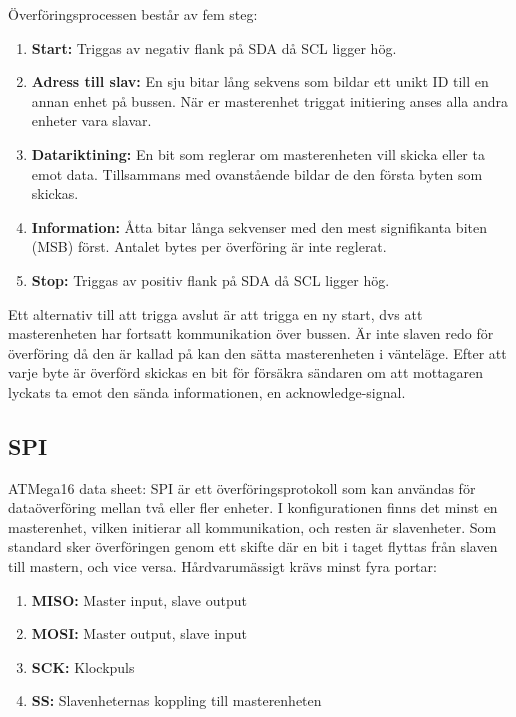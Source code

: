 \documentclass[11pt]{article}
\begin{document}
\begin{flushleft}
Överföringsprocessen består av fem steg: 

\begin{enumerate}
	\item \textbf{Start:} Triggas av negativ flank på SDA då SCL ligger hög.
	\item \textbf{Adress till slav:} En sju bitar lång sekvens som bildar ett unikt ID till en annan enhet på bussen. När er masterenhet triggat initiering anses alla andra enheter vara slavar.
	\item \textbf{Datariktining:} En bit som reglerar om masterenheten vill skicka eller ta emot data. Tillsammans med ovanstående bildar de den första byten som skickas.
	\item \textbf{Information:} Åtta bitar långa sekvenser med den mest signifikanta biten (MSB) först. Antalet bytes per överföring är inte reglerat.
	\item \textbf{Stop:} Triggas av positiv flank på SDA då SCL ligger hög.
\end{enumerate}

Ett alternativ till att trigga avslut är att trigga en ny start, dvs att masterenheten har fortsatt kommunikation över bussen. Är inte slaven redo för överföring då den är kallad på kan den sätta masterenheten i vänteläge. Efter att varje byte är överförd skickas en bit för försäkra sändaren om att mottagaren lyckats ta emot den sända informationen, en acknowledge-signal. \cite{guideI2CPhilips}

\subsection{SPI}
ATMega16 data sheet:
SPI är ett överföringsprotokoll som kan användas för dataöverföring mellan två eller fler enheter. I konfigurationen finns det minst en masterenhet, vilken initierar all kommunikation, och resten är slavenheter. Som standard sker överföringen genom ett skifte där en bit i taget flyttas från slaven till mastern, och vice versa. Hårdvarumässigt krävs minst fyra portar:

\begin{enumerate}
	\item \textbf{MISO:} Master input, slave output
	\item \textbf{MOSI:} Master output, slave input
	\item \textbf{SCK:} Klockpuls
	\item \textbf{SS:} Slavenheternas koppling till masterenheten
\end{enumerate}


\end{flushleft}
\end{document}

